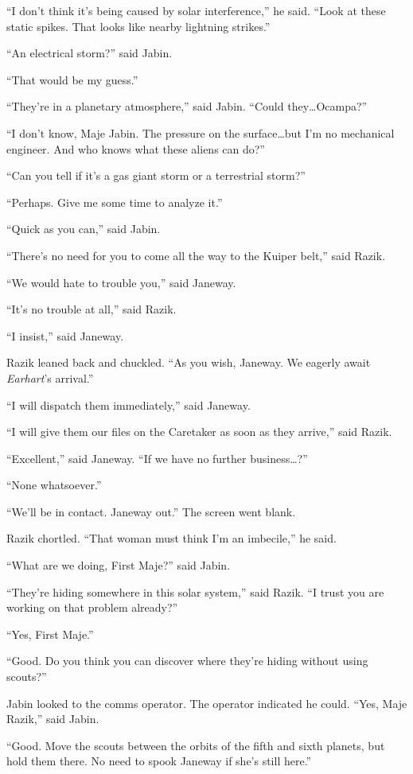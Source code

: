 \documentclass[twoside,letterpaper,12pt]{memoir}
\begin{document}
``I don't think it's being caused by solar interference,'' he said. ``Look at these static spikes. That looks like nearby lightning strikes.''

``An electrical storm?'' said Jabin.

``That would be my guess.''

``They're in a planetary atmosphere,'' said Jabin. ``Could they\ldots Ocampa?''

``I don't know, Maje Jabin. The pressure on the surface\ldots but I'm no mechanical engineer. And who knows what these aliens can do?''

``Can you tell if it's a gas giant storm or a terrestrial storm?''

``Perhaps. Give me some time to analyze it.''

``Quick as you can,'' said Jabin.

``There's no need for you to come all the way to the Kuiper belt,'' said Razik.

``We would hate to trouble you,'' said Janeway.

``It's no trouble at all,'' said Razik.

``I insist,'' said Janeway.

Razik leaned back and chuckled. ``As you wish, Janeway. We eagerly await \textit{Earhart}'s arrival.''

``I will dispatch them immediately,'' said Janeway.

``I will give them our files on the Caretaker as soon as they arrive,'' said Razik.

``Excellent,'' said Janeway. ``If we have no further business\ldots ?''

``None whatsoever.''

``We'll be in contact. Janeway out.'' The screen went blank.

Razik chortled. ``That woman must think I’m an imbecile,'' he said.

``What are we doing, First Maje?'' said Jabin.

``They're hiding somewhere in this solar system,'' said Razik. ``I trust you are working on that problem already?''

``Yes, First Maje.''

``Good. Do you think you can discover where they're hiding without using scouts?''

Jabin looked to the comms operator. The operator indicated he could. ``Yes, Maje Razik,'' said Jabin.

``Good. Move the scouts between the orbits of the fifth and sixth planets, but hold them there. No need to spook Janeway if she's still here.''
\end{document}
